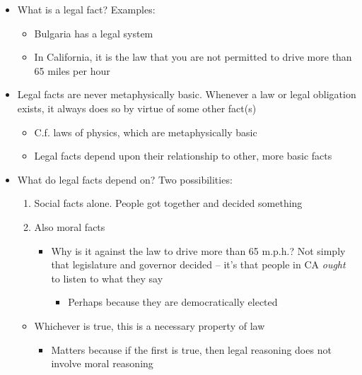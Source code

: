 \begin{itemize}
\tightlist
\item
  What is a legal fact? Examples:

  \begin{itemize}
  \tightlist
  \item
    Bulgaria has a legal system
  \item
    In California, it is the law that you are not permitted to drive
    more than 65 miles per hour
  \end{itemize}
\item
  Legal facts are never metaphysically basic. Whenever a law or legal
  obligation exists, it always does so by virtue of some other fact(s)

  \begin{itemize}
  \tightlist
  \item
    C.f. laws of physics, which are metaphysically basic
  \item
    Legal facts depend upon their relationship to other, more basic
    facts
  \end{itemize}
\item
  What do legal facts depend on? Two possibilities:

  \begin{enumerate}
  \def\labelenumi{\arabic{enumi}.}
  \tightlist
  \item
    Social facts alone. People got together and decided something
  \item
    Also moral facts

    \begin{itemize}
    \tightlist
    \item
      Why is it against the law to drive more than 65 m.p.h.? Not simply
      that legislature and governor decided -- it's that people in CA
      \emph{ought} to listen to what they say

      \begin{itemize}
      \tightlist
      \item
        Perhaps because they are democratically elected
      \end{itemize}
    \end{itemize}
  \end{enumerate}

  \begin{itemize}
  \tightlist
  \item
    Whichever is true, this is a necessary property of law

    \begin{itemize}
    \tightlist
    \item
      Matters because if the first is true, then legal reasoning does
      not involve moral reasoning


\end{itemize}
\end{itemize}
\end{itemize}
